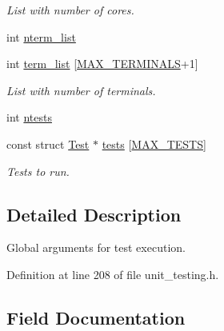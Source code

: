 \begin{DoxyCompactItemize}
\begin{DoxyCompactList}\small\item\em List with number of cores. \end{DoxyCompactList}\item 
int \hyperlink{structprogram__arguments_a48fbd16e4ce7ab5438078817c4931108}{nterm\+\_\+list}
\item 
int \hyperlink{structprogram__arguments_ab05abd5478458bb551479eb3e3dc75b1}{term\+\_\+list} \mbox{[}\hyperlink{bios_8h_a4e7d162c7c35103b42768ff4a5c73905}{M\+A\+X\+\_\+\+T\+E\+R\+M\+I\+N\+A\+LS}+1\mbox{]}\hypertarget{structprogram__arguments_ab05abd5478458bb551479eb3e3dc75b1}{}\label{structprogram__arguments_ab05abd5478458bb551479eb3e3dc75b1}

\begin{DoxyCompactList}\small\item\em List with number of terminals. \end{DoxyCompactList}\item 
int \hyperlink{structprogram__arguments_a8b96bf14afced6bae0d45424ab2fac57}{ntests}
\item 
const struct \hyperlink{structTest}{Test} $\ast$ \hyperlink{structprogram__arguments_a1db9e2ccc5b4309d559617d2b327e527}{tests} \mbox{[}\hyperlink{group__Testing_ga2a77d2f2c5b698c69c19e1f8782bf709}{M\+A\+X\+\_\+\+T\+E\+S\+TS}\mbox{]}\hypertarget{structprogram__arguments_a1db9e2ccc5b4309d559617d2b327e527}{}\label{structprogram__arguments_a1db9e2ccc5b4309d559617d2b327e527}

\begin{DoxyCompactList}\small\item\em Tests to run. \end{DoxyCompactList}\end{DoxyCompactItemize}


\subsection{Detailed Description}
Global arguments for test execution. 

Definition at line 208 of file unit\+\_\+testing.\+h.



\subsection{Field Documentation}
